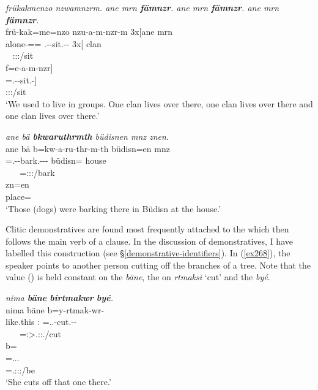 \begin{exe}
	\ex \emph{frükakmenzo nzwamnzrm. ane mrn \textbf{fämnzr}. ane mrn \textbf{fämnzr}. ane mrn \textbf{fämnzr}.}\\
	\glll frü-kak=me=nzo nzu-a-m-nzr-m 3x[ane mrn\\
	alone-\Distr=\Ins=\Only{} \Fnsg.\Betatwo-\Vc-sit.\Ext-\Ndu-\Dur{} 3x[\Dem{} clan\\
	~ {\Fpl:\Sbj:\Pst:\Dur/sit} ~ ~\\
	\sn
	\glll f=e-a-m-nzr]\\
	\Dist=\Stnsg.\Alph-\Vc-sit.\Ext-\Ndu]\\
	\footnotesize{\Stpl:\Sbj:\Nonpast:\Ipfv/sit}\\
	\trans `We used to live in groups. One clan lives over there, one clan lives over there and one clan lives over there.' 
	\label{ex266}
\end{exe}
\begin{exe}
	\ex \emph{ane bä \textbf{bkwaruthrmth} büdisnen mnz znen}.\\
	\glll ane bä b=kw-a-ru-thr-m-th büdisn=en mnz\\
	\Dem{} \Med{} \Med=\M.\Betaone-\Vc-bark.\Ext-\Ndu-\Dur-\Stnsg{} büdisn=\Loc{} house\\
	~ ~ {\Med=\Stpl:\Sbj:\Pst:\Dur/bark} ~ ~ ~\\
	\sn
	\gll zn=en\\
	place=\Loc{}\\
	\trans `Those (dogs) were barking there in Büdisn at the house.' 
	\label{ex267}
\end{exe}

Clitic demonstratives are found most frequently attached to the  which then follows the main verb of a clause. In the discussion of demonstratives, I have labelled this construction   (see \S{}\ref{demonstrative-identifiers}). In (\ref{ex268}), the speaker points to another person cutting off the branches of a tree. Note that the  value (\Med) is held constant on the   \emph{bäne}, the   on \emph{rtmaksi} `cut' and the   \emph{byé}.

\begin{exe}
	\ex \emph{nima \textbf{bäne} \textbf{birtmakwr} \textbf{byé}.}\\
	\glll nima bäne b=y-rtmak-wr-\Zero{}\\
	like.this \Dem:\Med{} \Med=\Tsg.\Masc.\Alph-cut.\Ext-\Ndu-\Stsg{}\\
	~ ~ {\Med=\Stsg:\Sbj>\Tsg.\Masc:\Obj:\Nonpast.\Ipfv/cut}\\
	\sn
	\glll b=\\
	\Med=\Tsg.\Masc.\Cop.\Ndu{}\\
	\footnotesize{\Med=\Tsg.\Masc:\Sbj:\Nonpast:\Ipfv/be}\\
	\trans `She cuts off that one there.' 
	\label{ex268}
\end{exe}

